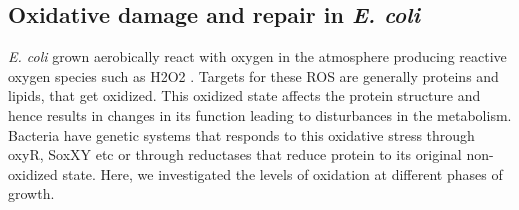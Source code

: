 \documentclass[12pt]{article}
\begin{document}
\subsection{Oxidative damage and repair in \emph{E. coli}}
%
%   
%   
%   
%

\emph{E. coli} grown aerobically react with oxygen in the atmosphere producing reactive oxygen species such as H2O2 \cite{GonzalezDemple1995}. Targets for these ROS are generally proteins and lipids, that get oxidized. This oxidized state affects the protein structure and hence results in changes in its function leading to disturbances in the metabolism. Bacteria have genetic systems that responds to this oxidative stress through oxyR, SoxXY etc or through reductases that reduce protein to its original non-oxidized state. Here, we investigated the levels of oxidation at different phases of growth.
\end{document}
